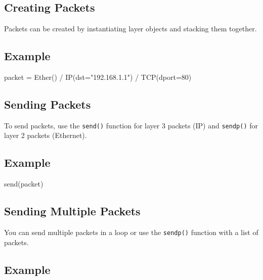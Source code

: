 \documentclass[
  letterpaper,
  DIV=11,
  numbers=noendperiod]{scrreprt}
\newenvironment{Shaded}{\begin{snugshade}}{\end{snugshade}}
\newcommand{\DecValTok}[1]{\textcolor[rgb]{0.68,0.00,0.00}{#1}}
\newcommand{\NormalTok}[1]{\textcolor[rgb]{0.00,0.23,0.31}{#1}}
\newcommand{\OperatorTok}[1]{\textcolor[rgb]{0.37,0.37,0.37}{#1}}
\newcommand{\StringTok}[1]{\textcolor[rgb]{0.13,0.47,0.30}{#1}}
\begin{document}
\subsection{Creating Packets}\label{creating-packets}

Packets can be created by instantiating layer objects and stacking them
together.

\subsection{Example}\label{example-18}

\begin{Shaded}
\begin{Highlighting}[]
\NormalTok{packet }\OperatorTok{=}\NormalTok{ Ether() }\OperatorTok{/}\NormalTok{ IP(dst}\OperatorTok{=}\StringTok{"192.168.1.1"}\NormalTok{) }\OperatorTok{/}\NormalTok{ TCP(dport}\OperatorTok{=}\DecValTok{80}\NormalTok{)}
\end{Highlighting}
\end{Shaded}

\subsection{Sending Packets}\label{sending-packets}

To send packets, use the \texttt{send()} function for layer 3 packets
(IP) and \texttt{sendp()} for layer 2 packets (Ethernet).

\subsection{Example}\label{example-19}

\begin{Shaded}
\begin{Highlighting}[]
\NormalTok{send(packet)}
\end{Highlighting}
\end{Shaded}

\subsection{Sending Multiple Packets}\label{sending-multiple-packets}

You can send multiple packets in a loop or use the \texttt{sendp()}
function with a list of packets.

\subsection{Example}\label{example-20}
\end{document}

